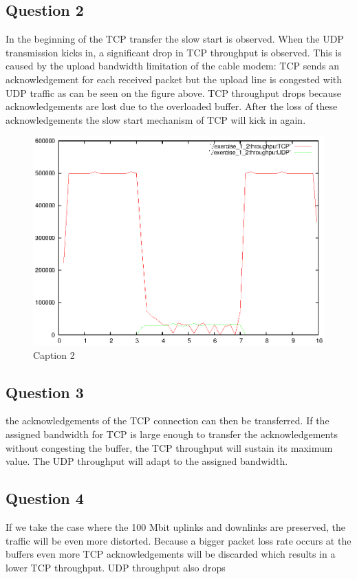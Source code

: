\documentclass[12pt]{article}
\begin{document}
\subsection*{Question 2}
In the beginning of the TCP transfer the slow start is observed. When the UDP transmission kicks in, a significant drop in TCP throughput is observed. This is caused by the upload bandwidth limitation of the cable modem: TCP sends an acknowledgement for each received packet but the upload line is congested with UDP traffic as can be seen on the figure above. TCP throughput drops because acknowledgements are lost due to the overloaded buffer. After the loss of these acknowledgements the slow start mechanism of TCP will kick in again.
\begin{figure}[h]
\centerline{\includegraphics{pictures/E1Q2.eps}}
\caption{Caption 2}
\label{fig:question2}
\end{figure}

\subsection*{Question 3}
the acknowledgements of the TCP connection can then be transferred. If the assigned bandwidth for TCP is large enough to transfer the acknowledgements without congesting the buffer, the TCP throughput will sustain its maximum value. The UDP throughput will adapt to the assigned bandwidth.  

\subsection*{Question 4}
If we take the case where the 100 Mbit uplinks and downlinks are preserved, the traffic will be even more distorted. Because a bigger packet loss rate occurs at the buffers even more TCP acknowledgements will be discarded which results in a lower TCP throughput. UDP throughput also drops 
\end{document}
